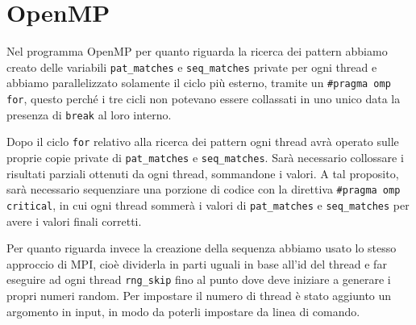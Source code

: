 \documentclass[12pt,openany]{report}
\begin{document}
\newpage
\section{OpenMP}
Nel programma OpenMP per quanto riguarda la ricerca dei pattern abbiamo creato delle variabili \texttt{pat\_matches} e \texttt{seq\_matches} private per ogni thread e abbiamo parallelizzato solamente il ciclo più esterno, tramite un \texttt{\#pragma omp for}, questo perché i tre cicli non potevano essere collassati in uno unico data la presenza di \texttt{break} al loro interno.
\bigskip

Dopo il ciclo \texttt{for} relativo alla ricerca dei pattern ogni thread avrà operato sulle proprie copie private di \texttt{pat\_matches} e \texttt{seq\_matches}. Sarà necessario collossare i risultati parziali ottenuti da ogni thread, sommandone i valori.
A tal proposito, sarà necessario sequenziare una porzione di codice con la direttiva \texttt{\#pragma omp critical}, in cui ogni thread sommerà i valori di \texttt{pat\_matches} e \texttt{seq\_matches} per avere i valori finali corretti.\bigskip

Per quanto riguarda invece la creazione della sequenza abbiamo usato lo stesso approccio di MPI, cioè dividerla in parti uguali in base all'id del thread e far eseguire ad ogni thread \texttt{rng\_skip} fino al punto dove deve iniziare a generare i propri numeri random. Per impostare il numero di thread è stato aggiunto un argomento in input, in modo da poterli impostare da linea di comando.\bigskip
\end{document}
